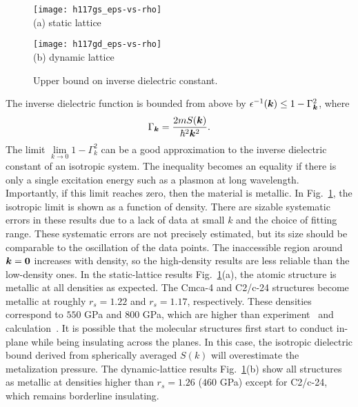 \begin{figure}[h]
	\centering
	\begin{minipage}{0.49\textwidth}
		\centering
		\texttt{[image: h117gs\_eps-vs-rho]}\\
		(a) static lattice
	\end{minipage}
	\begin{minipage}{0.49\textwidth}
		\centering
		\texttt{[image: h117gd\_eps-vs-rho]}\\
		(b) dynamic lattice
	\end{minipage}
	\caption{Upper bound on inverse dielectric constant.}
	\label{fig:hsolid-epsinv}
\end{figure}

The inverse dielectric function is bounded from above by $\epsilon^{-1}(\boldsymbol{k}) \le 1-\Gamma_{\boldsymbol{k}}^2$, where
\begin{align}
\Gamma_{\boldsymbol{k}} = \dfrac{2m S(\boldsymbol{k})}{\hbar^2 \boldsymbol{k}^2}.
\end{align}
The limit $\lim\limits_{k\rightarrow0} 1-\Gamma_k^2$ can be a good approximation to the inverse dielectric constant of an isotropic system.
The inequality becomes an equality if there is only a single excitation energy such as a plasmon at long wavelength.
Importantly, if this limit reaches zero, then the material is metallic.
In Fig.~\ref{fig:hsolid-epsinv}, the isotropic limit is shown as a function of density.
There are sizable systematic errors in these results due to a lack of data at small $k$ and the choice of fitting range.
These systematic errors are not precisely estimated, but its size should be comparable to the oscillation of the data points.
The inaccessible region around $\boldsymbol{k}=\boldsymbol{0}$ increases with density, so the high-density results are less reliable than the low-density ones.
In the static-lattice results Fig.~\ref{fig:hsolid-epsinv}(a), the atomic structure is metallic at all densities as expected.
The Cmca-4 and C2/c-24 structures become metallic at roughly $r_s=1.22$ and $r_s=1.17$, respectively. These densities correspond to $550$ GPa and $800$ GPa, which are higher than experiment~\cite{Loubeyre2020} and calculation~\cite{Gorelov2019}.
It is possible that the molecular structures first start to conduct in-plane while being insulating across the planes.
In this case, the isotropic dielectric bound derived from spherically averaged $S(k)$ will overestimate the metalization pressure.
The dynamic-lattice results Fig.~\ref{fig:hsolid-epsinv}(b) show all structures as metallic at densities higher than $r_s=1.26$ ($460$ GPa) except for C2/c-24, which remains borderline insulating.

